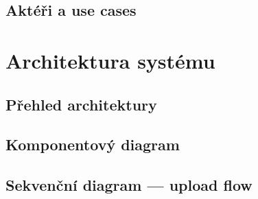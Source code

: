 \subsection{Aktéři a use cases}


\section{Architektura systému}
\label{sec:architektura}


\subsection{Přehled architektury}



\subsection{Komponentový diagram}


\subsection{Sekvenční diagram --- upload flow}


